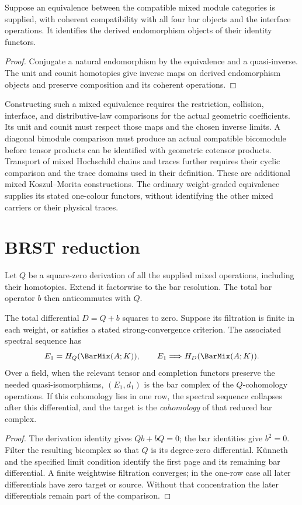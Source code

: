 \begin{proposition}
Suppose an equivalence between the compatible mixed module categories is supplied,
with coherent compatibility with all four bar objects and the interface operations.
It identifies the derived endomorphism objects of their identity functors.
\end{proposition}
\begin{proof}
Conjugate a natural endomorphism by the equivalence and a quasi-inverse.
The unit and counit homotopies give inverse maps on derived endomorphism objects
and preserve composition and its coherent operations.
\end{proof}

Constructing such a mixed equivalence requires the restriction, collision,
interface, and distributive-law comparisons for the actual geometric coefficients.
Its unit and counit must respect those maps and the chosen inverse limits.
A diagonal bimodule comparison must produce an actual compatible bicomodule
before tensor products can be identified with geometric cotensor products.
Transport of mixed Hochschild chains and traces further requires their
cyclic comparison and the trace domains used in their definition.
These are additional mixed Koszul--Morita constructions.
The ordinary weight-graded equivalence supplies its stated one-colour functors,
without identifying the other mixed carriers or their physical traces.

\section{BRST reduction}
Let $Q$ be a square-zero derivation of all the supplied mixed operations,
including their homotopies. Extend it factorwise to the bar resolution.
The total bar operator $b$ then anticommutes with $Q$.

\begin{theorem}
The total differential $D=Q+b$ squares to zero. Suppose its filtration is
finite in each weight, or satisfies a stated strong-convergence criterion.
The associated spectral sequence has
\[
 E_1=H_Q(\BarMix(\mathbb A;K)),\qquad
 E_1\Longrightarrow H_D(\BarMix(\mathbb A;K)).
\]
Over a field, when the relevant tensor and completion functors preserve
the needed quasi-isomorphisms, $(E_1,d_1)$ is the bar complex of the
$Q$-cohomology operations. If this cohomology lies in one row, the spectral
sequence collapses after this differential, and the target is the
\emph{cohomology} of that reduced bar complex.
\end{theorem}
\begin{proof}
The derivation identity gives $Qb+bQ=0$; the bar identities give $b^2=0$.
Filter the resulting bicomplex so that $Q$ is its degree-zero differential.
K\"unneth and the specified limit condition identify the first page and its
remaining bar differential. A finite weightwise filtration converges; in
the one-row case all later differentials have zero target or source.
Without that concentration the later differentials remain part of the
comparison.
\end{proof}

